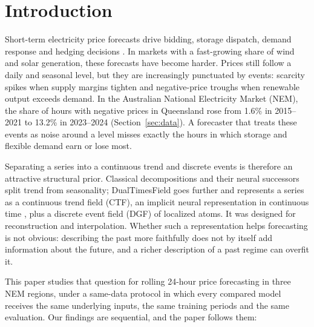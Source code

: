\documentclass[preprint,12pt]{elsarticle}
\begin{document}
\linenumbers

\section{Introduction}
\label{sec:introduction}

Short-term electricity price forecasts drive bidding, storage dispatch, demand response and hedging decisions \citep{weron2014electricity,hong2020energy}. In markets with a fast-growing share of wind and solar generation, these forecasts have become harder. Prices still follow a daily and seasonal level, but they are increasingly punctuated by events: scarcity spikes when supply margins tighten and negative-price troughs when renewable output exceeds demand. In the Australian National Electricity Market (NEM), the share of hours with negative prices in Queensland rose from 1.6\% in 2015--2021 to 13.2\% in 2023--2024 (Section~\ref{sec:data}). A forecaster that treats these events as noise around a level misses exactly the hours in which storage and flexible demand earn or lose most.

Separating a series into a continuous trend and discrete events is therefore an attractive structural prior. Classical decompositions and their neural successors \citep{wu2021autoformer,oreshkin2020nbeats,zeng2023transformers} split trend from seasonality; DualTimesField \citep{zhang2026dualtimesfield} goes further and represents a series as a continuous trend field (CTF), an implicit neural representation in continuous time \citep{sitzmann2020implicit,tancik2020fourier}, plus a discrete event field (DGF) of localized atoms. It was designed for reconstruction and interpolation. Whether such a representation helps forecasting is not obvious: describing the past more faithfully does not by itself add information about the future, and a richer description of a past regime can overfit it.

This paper studies that question for rolling 24-hour price forecasting in three NEM regions, under a same-data protocol in which every compared model receives the same underlying inputs, the same training periods and the same evaluation. Our findings are sequential, and the paper follows them:
\end{document}
